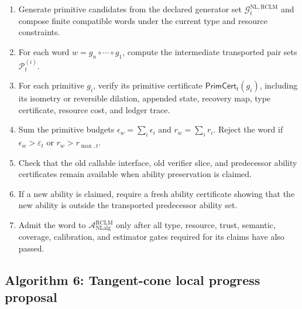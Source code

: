 \documentclass[11pt,a4paper]{article}
\newcommand{\Pcal}{\mathcal P}
\newcommand{\Acal}{\mathcal A}
\newcommand{\eps}{\varepsilon}
\newcommand{\RCLM}{\mathrm{RCLM}}
\newcommand{\NL}{\mathrm{NL}}
\newcommand{\NLalg}{\mathrm{NLalg}}
\begin{document}
\begin{enumerate}[label=\textbf{C\arabic*.}, leftmargin=2em]
    \item Generate primitive candidates from the declared generator set \(\mathcal G_t^{\NL,\RCLM}\) and compose finite compatible words under the current type and resource constraints.
    \item For each word \(w=g_n\circ\cdots\circ g_1\), compute the intermediate transported pair sets \(\Pcal_t^{(i)}\).
    \item For each primitive \(g_i\), verify its primitive certificate \(\mathsf{PrimCert}_t(g_i)\), including its isometry or reversible dilation, appended state, recovery map, type certificate, resource cost, and ledger trace.
    \item Sum the primitive budgets \(\epsilon_w=\sum_i\epsilon_i\) and \(r_w=\sum_i r_i\). Reject the word if \(\epsilon_w>\eps_t\) or \(r_w>r_{\max,t}\).
    \item Check that the old callable interface, old verifier slice, and predecessor ability certificates remain available when ability preservation is claimed.
    \item If a new ability is claimed, require a fresh ability certificate showing that the new ability is outside the transported predecessor ability set.
    \item Admit the word to \(\Acal_{\NLalg}^{\RCLM}\) only after all type, resource, trust, semantic, coverage, calibration, and estimator gates required for its claims have also passed.
\end{enumerate}


\subsection{Algorithm 6: Tangent-cone local progress proposal}
\end{document}
